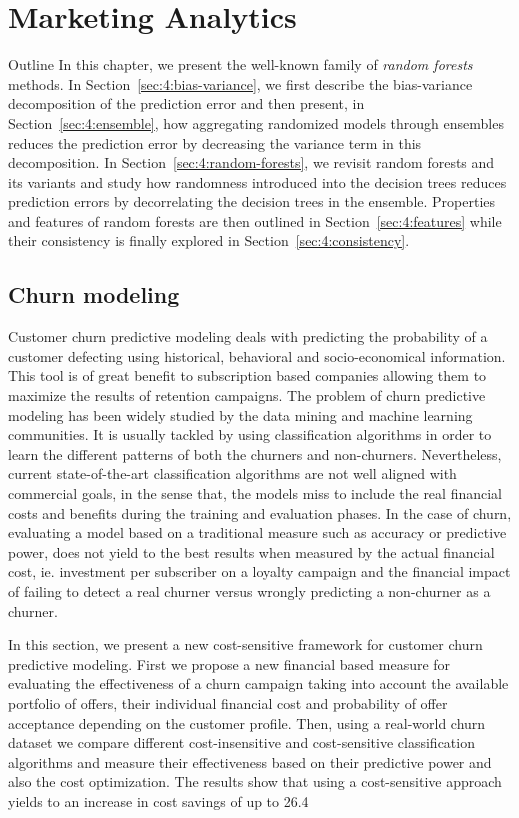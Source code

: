 \chapter{Marketing Analytics}

\begin{remark}{Outline}
In this chapter, we present the well-known family of \textit{random forests}
methods. In Section~\ref{sec:4:bias-variance}, we first describe the bias-variance
decomposition of the prediction error and then present, in
Section~\ref{sec:4:ensemble}, how aggregating randomized models through
ensembles reduces the prediction error by decreasing the variance term in this
decomposition. In Section~\ref{sec:4:random-forests}, we revisit random forests
and its variants and study how randomness introduced into the decision trees
reduces prediction errors by decorrelating the decision
trees in the ensemble. Properties and features of random forests are then outlined
in Section~\ref{sec:4:features} while their consistency
is finally explored in Section~\ref{sec:4:consistency}.
\end{remark}

\section{Churn modeling}
Customer churn predictive modeling deals with predicting the probability of a customer defecting 
using historical, behavioral and socio-economical information. This tool is of great benefit to 
subscription based companies allowing them to maximize the results of retention campaigns. The 
problem of churn predictive modeling has been widely studied by the data mining and machine learning
communities. It is usually tackled by using classification algorithms in order to learn the 
different patterns of both the churners and non-churners. Nevertheless, current state-of-the-art 
classification algorithms are not well aligned with commercial goals, in the sense that, the models 
miss to include the real financial costs and benefits during the training and evaluation phases. In 
the case of churn, evaluating a model based on a traditional measure such as accuracy or predictive 
power, does not yield to the best results when measured by the actual financial cost, ie. 
investment per subscriber on a loyalty campaign and the financial impact of failing to detect a 
real churner versus wrongly predicting a non-churner as a churner.

In this section, we present a new cost-sensitive framework for customer churn predictive modeling. 
First we propose a new financial based measure for evaluating the effectiveness of a churn campaign 
taking into account the available portfolio of offers, their individual financial cost and 
probability of offer acceptance depending on the customer profile. Then, using a real-world churn
dataset we compare different cost-insensitive and cost-sensitive classification algorithms and 
measure their effectiveness based on their predictive power and also the cost optimization. The 
results show that using a cost-sensitive approach yields to an increase in cost savings of up to 
26.4%


